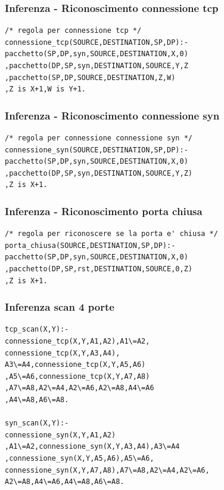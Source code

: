 \documentclass{beamer}
\begin{document}
\begin{frame}[fragile]
\frametitle{Inferenza - Riconoscimento connessione tcp}
\begin{lstlisting}
/* regola per connessione tcp */
connessione_tcp(SOURCE,DESTINATION,SP,DP):-
pacchetto(SP,DP,syn,SOURCE,DESTINATION,X,0)
,pacchetto(DP,SP,syn,DESTINATION,SOURCE,Y,Z
,pacchetto(SP,DP,SOURCE,DESTINATION,Z,W)
,Z is X+1,W is Y+1.
\end{lstlisting}


\end{frame}


\begin{frame}[fragile]
\frametitle{Inferenza - Riconoscimento connessione syn}
\begin{lstlisting}
/* regola per connessione connessione syn */
connessione_syn(SOURCE,DESTINATION,SP,DP):-
pacchetto(SP,DP,syn,SOURCE,DESTINATION,X,0)
,pacchetto(DP,SP,syn,DESTINATION,SOURCE,Y,Z)
,Z is X+1.

\end{lstlisting}
\end{frame}



\begin{frame}[fragile]
\frametitle{Inferenza - Riconoscimento porta chiusa}
\begin{lstlisting}
/* regola per riconoscere se la porta e' chiusa */
porta_chiusa(SOURCE,DESTINATION,SP,DP):-
pacchetto(SP,DP,syn,SOURCE,DESTINATION,X,0)
,pacchetto(DP,SP,rst,DESTINATION,SOURCE,0,Z)
,Z is X+1.

\end{lstlisting}
\end{frame}


\begin{frame}[fragile]
\frametitle{Inferenza scan 4 porte}
\begin{lstlisting}
tcp_scan(X,Y):- 
connessione_tcp(X,Y,A1,A2),A1\=A2,
connessione_tcp(X,Y,A3,A4),
A3\=A4,connessione_tcp(X,Y,A5,A6)
,A5\=A6,connessione_tcp(X,Y,A7,A8)
,A7\=A8,A2\=A4,A2\=A6,A2\=A8,A4\=A6
,A4\=A8,A6\=A8.

syn_scan(X,Y):- 
connessione_syn(X,Y,A1,A2)
,A1\=A2,connessione_syn(X,Y,A3,A4),A3\=A4
,connessione_syn(X,Y,A5,A6),A5\=A6,
connessione_syn(X,Y,A7,A8),A7\=A8,A2\=A4,A2\=A6,
A2\=A8,A4\=A6,A4\=A8,A6\=A8.
\end{lstlisting}
\end{frame}
\end{document}
